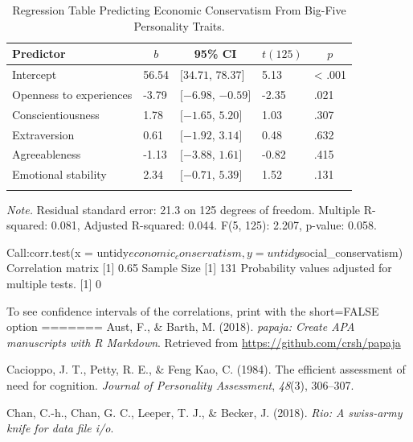 \documentclass[man]{apa6}
\begin{document}
\begin{table}[tbp]
\begin{center}
\begin{threeparttable}
\caption{\label{tab:table4}Regression Table Predicting Economic Conservatism From Big-Five Personality Traits.}
\begin{tabular}{lllll}
\toprule
Predictor & \multicolumn{1}{c}{$b$} & \multicolumn{1}{c}{95\% CI} & \multicolumn{1}{c}{$t(125)$} & \multicolumn{1}{c}{$p$}\\
\midrule
Intercept & 56.54 & $[34.71$, $78.37]$ & 5.13 & < .001\\
Openness to experiences & -3.79 & $[-6.98$, $-0.59]$ & -2.35 & .021\\
Conscientiousness & 1.78 & $[-1.65$, $5.20]$ & 1.03 & .307\\
Extraversion & 0.61 & $[-1.92$, $3.14]$ & 0.48 & .632\\
Agreeableness & -1.13 & $[-3.88$, $1.61]$ & -0.82 & .415\\
Emotional stability & 2.34 & $[-0.71$, $5.39]$ & 1.52 & .131\\
\bottomrule
\addlinespace
\end{tabular}
\begin{tablenotes}[para]
\normalsize{\textit{Note.} Residual standard error: 21.3 on 125 degrees of freedom. Multiple R-squared: 0.081, Adjusted R-squared: 0.044. F(5, 125): 2.207, p-value: 0.058.}
\end{tablenotes}
\end{threeparttable}
\end{center}
\end{table}

Call:corr.test(x =
untidy\(economic_conservatism, y = untidy\)social\_conservatism)
Correlation matrix {[}1{]} 0.65 Sample Size {[}1{]} 131 Probability
values adjusted for multiple tests. {[}1{]} 0

To see confidence intervals of the correlations, print with the
short=FALSE option
=======
\leavevmode\hypertarget{ref-R-papaja}{}%
Aust, F., \& Barth, M. (2018). \emph{papaja: Create APA manuscripts with R Markdown}. Retrieved from \url{https://github.com/crsh/papaja}

\leavevmode\hypertarget{ref-cacioppo1984efficient}{}%
Cacioppo, J. T., Petty, R. E., \& Feng Kao, C. (1984). The efficient assessment of need for cognition. \emph{Journal of Personality Assessment}, \emph{48}(3), 306--307.

\leavevmode\hypertarget{ref-R-rio}{}%
Chan, C.-h., Chan, G. C., Leeper, T. J., \& Becker, J. (2018). \emph{Rio: A swiss-army knife for data file i/o}.
\end{document}
